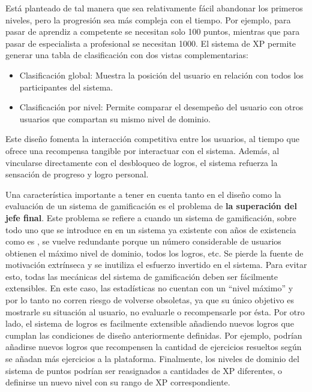 Está planteado de tal manera que sea relativamente fácil abandonar los primeros niveles, pero la progresión sea más compleja con el tiempo. Por ejemplo, para pasar de aprendiz a competente se necesitan solo 100 puntos, mientras que para pasar de especialista a profesional se necesitan 1000. 
El sistema de XP permite generar una tabla de clasificación con dos vistas complementarias:

\begin{itemize}
    \item Clasificación global: Muestra la posición del usuario en relación con todos los participantes del sistema.
    \item Clasificación por nivel: Permite comparar el desempeño del usuario con otros usuarios que compartan su mismo nivel de dominio.
\end{itemize}

Este diseño fomenta la interacción competitiva entre los usuarios, al tiempo que ofrece una recompensa\textbf{ }tangible por interactuar con el sistema. Además, al vincularse directamente con el desbloqueo de logros, el sistema refuerza la sensación de progreso y logro personal.

Una característica importante a tener en cuenta tanto en el diseño como la evaluación de un sistema de gamificación es el problema de \textbf{la superación del jefe final}. Este problema se refiere a cuando un sistema de gamificación, sobre todo uno que se introduce en en un sistema ya existente con años de existencia como es \aer, se vuelve redundante porque un número considerable de usuarios obtienen el máximo nivel de dominio, todos los logros, etc. Se pierde la fuente de motivación extrínseca y se inutiliza el esfuerzo invertido en el sistema. Para evitar esto, todas las mecánicas del sistema de gamificación deben ser fácilmente extensibles. 
En este caso, las estadísticas no cuentan con un \enquote{nivel máximo} y por lo tanto no corren riesgo de volverse obsoletas, ya que su único objetivo es mostrarle su situación al usuario, no evaluarle o recompensarle por ésta. Por otro lado, el sistema de logros es facilmente extensible añadiendo nuevos logros que cumplan las condiciones de diseño anteriormente definidas. Por ejemplo, podrían añadirse nuevos logros que recompensen la cantidad de ejercicios resueltos según se añadan más ejercicios a la plataforma. Finalmente, los niveles de dominio del sistema de puntos podrían ser reasignados a cantidades de XP diferentes, o definirse un nuevo nivel con su rango de XP correspondiente.

